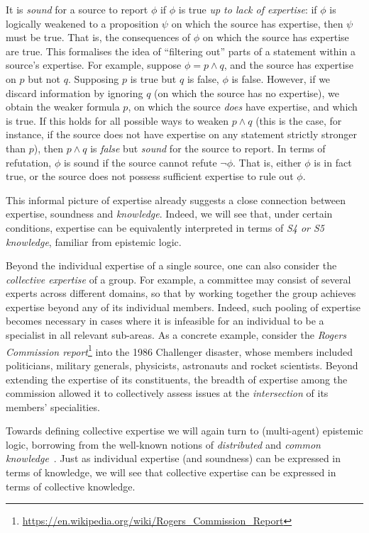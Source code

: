 It is \emph{sound} for a source to report $\phi$ if $\phi$ is true \emph{up to
lack of expertise}: if $\phi$ is logically weakened to a proposition $\psi$ on
which the source has expertise, then $\psi$ must be true. That is, the
consequences of $\phi$ on which the source has expertise are true.
%
This formalises the idea of ``filtering out'' parts of a statement within a
source's expertise. For example, suppose $\phi = p \land q$, and the source has
expertise on $p$ but not $q$. Supposing $p$ is true but $q$ is false, $\phi$ is
false. However, if we discard information by ignoring $q$ (on which the source
has no expertise), we obtain the weaker formula $p$, on which the source
\emph{does} have expertise, and which is true. If this holds for all possible
ways to weaken $p \land q$ (this is the case, for instance, if the source does
not have expertise on any statement strictly stronger than $p$), then $p \land
q$ is \emph{false} but \emph{sound} for the source to report.
%
In terms of refutation, $\phi$ is sound if the source cannot refute $\neg\phi$.
That is, either $\phi$ is in fact true, or the source does not possess
sufficient expertise to rule out $\phi$.

This informal picture of expertise already suggests a close connection between
expertise, soundness and \emph{knowledge}. Indeed, we will see that, under
certain conditions, expertise can be equivalently interpreted in terms of
\emph{S4 or S5 knowledge}, familiar from epistemic logic.

Beyond the individual expertise of a single source, one can also consider the
\emph{collective expertise} of a group. For example, a committee may consist of
several experts across different domains, so that by working together the group
achieves expertise beyond any of its individual members. Indeed, such pooling
of expertise becomes necessary in cases where it is infeasible for an
individual to be a specialist in all relevant sub-areas. As a concrete example,
consider the \emph{Rogers Commission
report}\footnote{\url{https://en.wikipedia.org/wiki/Rogers_Commission_Report}}
into the 1986 Challenger disaster, whose members included politicians, military
generals, physicists, astronauts and rocket scientists. Beyond extending the
expertise of its constituents, the breadth of expertise among the commission
allowed it to collectively assess issues at the \emph{intersection} of its
members' specialities.

Towards defining collective expertise we will again turn to (multi-agent)
epistemic logic, borrowing from the well-known notions of \emph{distributed}
and \emph{common knowledge}~\cite{fagin2003reasoning}. Just as individual
expertise (and soundness) can be expressed in terms of knowledge, we will see
that collective expertise can be expressed in terms of collective knowledge.

